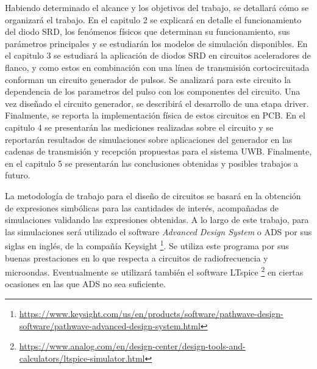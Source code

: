 Habiendo determinado el alcance y los objetivos del trabajo, se detallará cómo
se organizará el trabajo. En el capitulo 2 se explicará en detalle el
funcionamiento del diodo SRD, los fenómenos físicos que determinan su
funcionamiento, sus parámetros principales y se estudiarán los modelos de
simulación disponibles. En el capitulo 3 se estudiará la aplicación de diodos
SRD en circuitos aceleradores de flanco, y como estos en combinación con una
línea de transmisión cortocircuitada conforman un circuito generador de pulsos.
Se analizará para este circuito la dependencia de los parametros del pulso con
los componentes del circuito. Una vez diseñado el circuito generador, se
describirá el desarrollo de una etapa driver. Finalmente, se reporta  la
implementación física de estos circuitos en PCB. En el capitulo 4 se presentarán
las mediciones realizadas sobre el circuito y se reportarán resultados de
simulaciones sobre aplicaciones del generador en las cadenas de transmisión y
recepción propuestas para el sistema UWB. Finalmente, en el capitulo 5 se
presentarán las conclusiones obtenidas y posibles trabajos a futuro.

La metodología de trabajo para el diseño de circuitos se basará en la obtención
de expresiones simbólicas para las cantidades de interés, acompañadas de
simulaciones validando las expresiones obtenidas. A lo largo de este trabajo,
para las simulaciones será utilizado el software \textit{Advanced Design System}
o ADS por sus siglas en inglés, de la compañía Keysight
\footnote{\url{https://www.keysight.com/us/en/products/software/pathwave-design-software/pathwave-advanced-design-system.html}}.
Se utiliza este programa por sus buenas prestaciones en lo que respecta a
circuitos de radiofrecuencia y microondas. Eventualmente se utilizará también el
software LTspice
\footnote{\url{https://www.analog.com/en/design-center/design-tools-and-calculators/ltspice-simulator.html}}
en ciertas ocasiones en las que ADS no sea suficiente.
